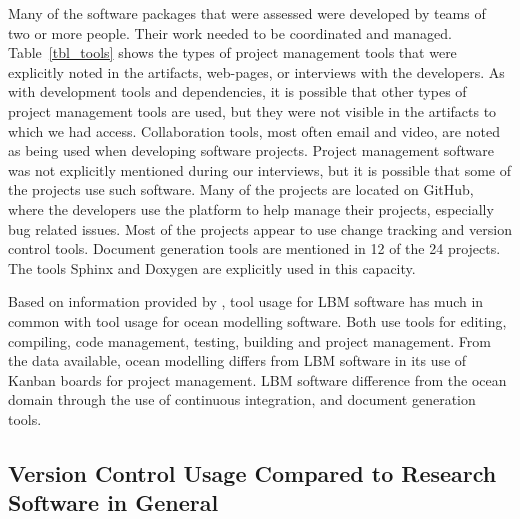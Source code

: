 \documentclass[final, 3p, times, authoryear]{elsarticle}
\begin{document}
Many of the software packages that were assessed were developed by teams of two
or more people. Their work needed to be coordinated and managed.
Table~\ref{tbl_tools} shows the types of project management tools that were
explicitly noted in the artifacts, web-pages, or interviews with the developers.
As with development tools and dependencies, it is possible that other types of
project management tools are used, but they were not visible in the artifacts to
which we had access.  Collaboration tools, most often email and video, are noted
as being used when developing software projects. Project management software was
not explicitly mentioned during our interviews, but it is possible that some of
the projects use such software. Many of the projects are located on GitHub,
where the developers use the platform to help manage their projects, especially
bug related issues. Most of the projects appear to use change tracking and
version control tools. Document generation tools are mentioned in 12 of the 24
projects. The tools Sphinx and Doxygen are explicitly used in this capacity.

Based on information provided by \citet{JungEtAl2022}, tool usage for
LBM software has much in common with tool usage for ocean modelling
software.  Both use tools for editing, compiling, code management, testing,
building and project management.  From the data available, ocean modelling
differs from LBM software in its use of Kanban boards for project management.
LBM software difference from the ocean domain through the use of continuous
integration, and document generation tools.

\subsection{Version Control Usage Compared to Research Software in General}
\end{document}
